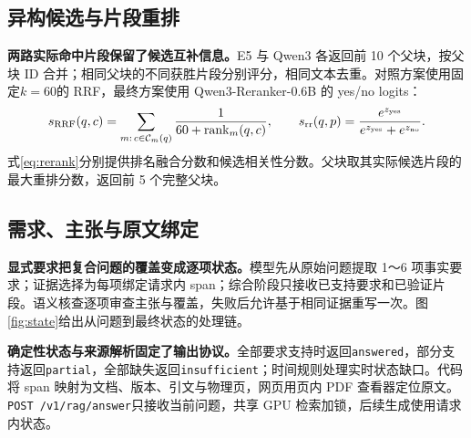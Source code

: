 \subsection{异构候选与片段重排}
\textbf{两路实际命中片段保留了候选互补信息。}E5 与 Qwen3 各返回前 10 个父块，按父块 ID 合并；相同父块的不同获胜片段分别评分，相同文本去重。对照方案使用固定\(k=60\)的 RRF，最终方案使用 Qwen3-Reranker-0.6B 的 yes/no logits：
\begin{equation}
s_{\rm RRF}(q,c)=\sum_{m:\,c\in\mathcal C_m(q)}\frac{1}{60+\operatorname{rank}_m(q,c)},\qquad
s_{\rm rr}(q,p)=\frac{e^{z_{\rm yes}}}{e^{z_{\rm yes}}+e^{z_{\rm no}}}.
\label{eq:rerank}
\end{equation}
式\eqref{eq:rerank}分别提供排名融合分数和候选相关性分数。父块取其实际候选片段的最大重排分数，返回前 5 个完整父块。

\subsection{需求、主张与原文绑定}
\textbf{显式要求把复合问题的覆盖变成逐项状态。}模型先从原始问题提取 1～6 项事实要求；证据选择为每项绑定请求内 span；综合阶段只接收已支持要求和已验证片段。语义核查逐项审查主张与覆盖，失败后允许基于相同证据重写一次。图\ref{fig:state}给出从问题到最终状态的处理链。


\textbf{确定性状态与来源解析固定了输出协议。}全部要求支持时返回\texttt{answered}，部分支持返回\texttt{partial}，全部缺失返回\texttt{insufficient}；时间规则处理实时状态缺口。代码将 span 映射为文档、版本、引文与物理页，网页用页内 PDF 查看器定位原文。\texttt{POST /v1/rag/answer}只接收当前问题，共享 GPU 检索加锁，后续生成使用请求内状态。
